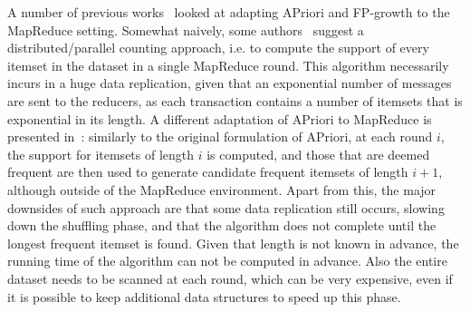A number of previous
works~\citep{CryansRC10,GhotingKPK11,Hammoud11,LiWZZC08,LiZ11,YangLF10,ZhouZCLF10}
looked at adapting APriori and FP-growth to the MapReduce setting. Somewhat
naively, some authors~\citep{CryansRC10,LiZ11,YangLF10} suggest a distributed/parallel
counting approach, i.e. to compute the support of every itemset in the dataset
in a single MapReduce round. This algorithm necessarily incurs in a huge data
replication, given that an exponential number of messages are sent to the
reducers, as each transaction contains a number of itemsets that is exponential
in its length. A different adaptation of APriori to MapReduce is presented
in~\cite[Chap.4]{Hammoud11}: similarly to the original formulation of APriori,
at each round $i$, the support for itemsets of length $i$ is computed, and those
that are deemed frequent are then used to generate candidate frequent itemsets
of length $i+1$, although outside of the MapReduce environment. Apart from this,
the major downsides of such approach are that some data replication still
occurs, slowing down the shuffling phase, and that the algorithm does not
complete until the longest frequent itemset is found. Given that length is not
known in advance, the running time of the algorithm can not be
computed in advance. Also the entire dataset needs to be scanned at each round, which
can be very expensive, even if it is possible to keep additional data structures
to speed up this phase.  


